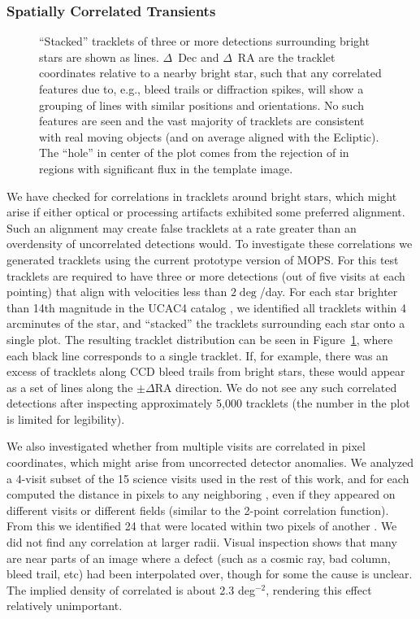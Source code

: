 \subsubsection{Spatially Correlated Transients}

\begin{figure}
  \centering
  \caption{
  ``Stacked'' tracklets of three or more detections surrounding bright stars are shown
    as lines. $\Delta$~Dec and $\Delta$~RA are the tracklet coordinates relative to a nearby
  bright star, such that any correlated features due to, e.g., bleed trails or
  diffraction spikes, will show a grouping of lines with similar positions and
  orientations. No such features are seen and the vast majority of
  tracklets are consistent with real moving objects (and on average aligned with
  the Ecliptic). The ``hole'' in center of the plot comes from the rejection of \DIASources
  in regions with significant flux in the template image.
  }
  \label{fig:stacked_tracklets}
\end{figure}

We have checked for correlations in tracklets around bright stars, which
might arise if either optical or processing artifacts exhibited some preferred
alignment. Such an alignment may create false tracklets at a rate greater than
an overdensity of uncorrelated detections would. To investigate these
correlations we generated tracklets using the current prototype version of MOPS.
For this test tracklets are required to have three or more detections (out of five visits
at each pointing) that align with velocities less than $2\deg$/day. For each
star brighter than 14th magnitude in the UCAC4 catalog \citep{UCAC4}, we
identified all tracklets within 4 arcminutes of the star, and ``stacked'' the
tracklets surrounding each star onto a single plot. The resulting tracklet
distribution can be seen in Figure~\ref{fig:stacked_tracklets}, where each black
line corresponds to a single tracklet. If, for example, there was an excess of
tracklets along CCD bleed trails from bright stars, these would appear as a set
of lines along the $\pm\Delta \textrm{RA}$ direction. We do not see any such
correlated detections after inspecting approximately 5,000 tracklets (the number
in the plot is limited for legibility).

We also investigated whether \DIASources from multiple visits are correlated
in pixel coordinates, which might arise from uncorrected detector anomalies.
We analyzed a 4-visit subset of the 15 science visits used in the rest of this
work, and for each \DIASource computed the distance in pixels to any neighboring
\DIASources, even if they appeared on different visits or different fields
(similar to the 2-point correlation function). From this we identified  24
\DIASources that were located within two pixels of another \DIASource. We did
not find any correlation at larger radii. Visual inspection shows that many are
near parts of an image where a defect (such as a cosmic ray, bad column, bleed
trail, etc) had been interpolated over, though for some the cause is unclear.
The implied density of correlated \DIASources is about 2.3 deg$^{-2}$, rendering
this effect relatively unimportant.

